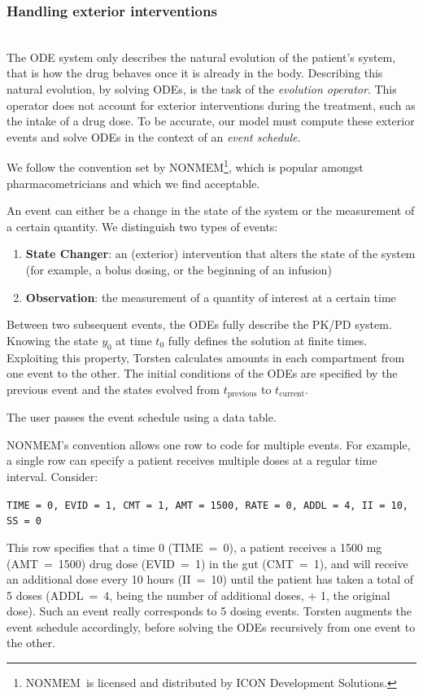 \documentclass[11pt]{amsart}
\begin{document}
\subsubsection{Handling exterior interventions} \ \\

The ODE system only describes the natural evolution of the patient's system, that is 
how the drug behaves once it is already in the body. Describing this natural evolution, 
by solving ODEs, is the task of the \textit{evolution operator}. This operator does not 
account for exterior interventions during the treatment, such as the intake of a drug 
dose. To be accurate, our model must compute these exterior events and solve ODEs
in the context of an \textit{event schedule}.

We follow the convention set by NONMEM\textregistered\footnote{NONMEM\textregistered\ 
is licensed and distributed by ICON Development Solutions.}, which is popular amongst 
pharmacometricians and which we find acceptable.

An event can either be a change in the state of the system or the measurement of a certain 
quantity. We distinguish two types of events:
\begin{enumerate}
  \item \textbf{State Changer}: an (exterior) intervention that alters the state of the 
  system (for example, a bolus dosing, or the beginning of an infusion)
  \item \textbf{Observation}: the measurement of a quantity of interest at a certain time
\end{enumerate}

Between two subsequent events, the ODEs fully describe the PK/PD system. Knowing 
the state $y_0$ at time $t_0$ fully defines the solution at finite times. Exploiting this 
property, Torsten calculates amounts in each compartment from one event to the other.
 The initial conditions of the ODEs are specified by the previous event and the states 
 evolved from $t_\mathrm{previous}$ to $t_\mathrm{current}$.

The user passes the event schedule using a data table. 

NONMEM's convention allows one row to code for multiple events. For example, a 
single row can specify a patient receives multiple doses at a regular time interval. Consider:

\texttt{TIME = 0, EVID = 1, CMT = 1, AMT = 1500, RATE = 0, ADDL = 4, II = 10, SS = 0}

This row specifies that a time 0 (\hbox{TIME = 0}), a patient receives a 1500 mg 
(\hbox{AMT = 1500}) drug dose (\hbox{EVID = 1}) in the gut (\hbox{CMT = 1}), and will 
receive an additional dose every 10 hours (\hbox{II = 10}) until the patient has taken a 
total of 5 doses (\hbox{ADDL = 4}, being the number of additional doses, + 1, the original 
dose). Such an event really corresponds to 5 dosing events. Torsten augments the event 
schedule accordingly, before solving the ODEs recursively from one event to the other.
\end{document}
